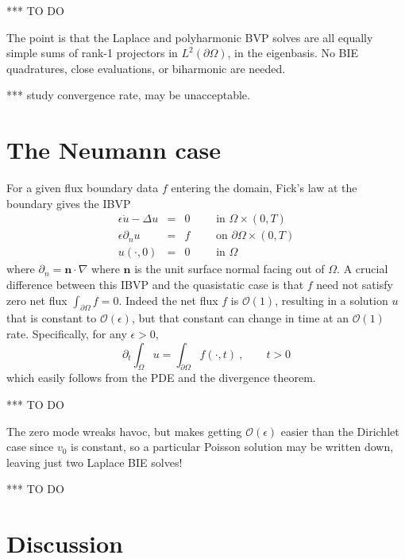 \documentclass[10pt]{article}
\newcommand{\be}{\begin{equation}}
\newcommand{\ee}{\end{equation}}
\newcommand{\bea}{\begin{eqnarray}}
\newcommand{\eea}{\end{eqnarray}}
\newcommand{\mbf}[1]{{\mathbf #1}}
\newcommand{\bigO}{{\mathcal O}}
\newcommand{\pO}{{\partial\Omega}}
\newcommand{\eps}{\epsilon}
\newcommand{\dn}{\partial_n}
\newcommand{\dt}{\partial_t}
\begin{document}
*** TO DO

The point is that the Laplace and polyharmonic BVP solves
are all equally
simple sums of rank-1 projectors in $L^2(\pO)$, in the eigenbasis.
No BIE quadratures, close evaluations, or biharmonic are needed.

*** study convergence rate, may be unacceptable.


\section{The Neumann case}

For a given flux boundary data $f$ entering the domain,
Fick's law at the boundary gives the IBVP
\bea
\eps\dot{u} - \Delta u &=& 0    \qquad \mbox{ in } \Omega\times (0,T)
\label{pden}
\\
\eps \dn u  &=& f  \qquad \mbox{ on } \pO \times (0,T)
\label{bcn}
\\
u(\cdot, 0)    &=&  0 \qquad \mbox{ in } \Omega
\eea
where $\dn = \mbf{n}\cdot\nabla$ where $\mbf{n}$ is the unit surface
normal facing out of $\Omega$.
A crucial difference between this IBVP and the quasistatic case
is that $f$ need not satisfy zero net flux $\int_\pO f = 0$.
Indeed the net flux $f$ is $\bigO(1)$, resulting in a solution $u$ that
is constant to $\bigO(\eps)$, but that constant can change in time
at an $\bigO(1)$ rate.
Specifically, for any $\eps>0$,
\be
\dt \int_\Omega u = \int_\pO f(\cdot,t)~, \qquad t>0
\label{cons}
\ee
which easily follows from the PDE and the divergence theorem.



*** TO DO

The zero mode wreaks havoc, but makes getting $\bigO(\eps)$ easier
than the Dirichlet case since $v_0$ is constant,
so a particular Poisson solution may be written down, leaving just two Laplace BIE solves!

*** TO DO






\section{Discussion}
\end{document}
